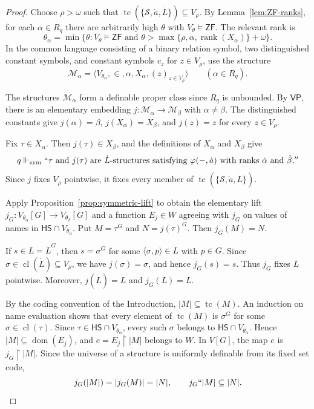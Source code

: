 \documentclass[11pt,a4paper]{amsart}
\newcommand{\VP}{\mathsf{VP}}
\newcommand{\ZF}{\mathsf{ZF}}
\newcommand{\HS}{\mathsf{HS}}
\newcommand{\tc}{\operatorname{tc}}
\newcommand{\rank}{\operatorname{rank}}
\newcommand{\forcesS}{\Vdash_{\mathrm{sym}}}
\newcommand{\restr}{\mathbin{\upharpoonright}}
\theoremstyle{plain}
\theoremstyle{definition}
\theoremstyle{remark}
\begin{document}
\begin{proof}
Choose $\rho>\omega$ such that $\tc(\{\mathscr S,\dot a,\dot L\})\subseteq V_\rho$.  By Lemma~\ref{lem:ZF-ranks}, for each $\alpha\in R_q$ there are arbitrarily high $\theta$ with $V_\theta\models\ZF$.  The relevant rank is
\[
\theta_\alpha=\min\bigl\{\theta:V_\theta\models\ZF\text{ and }
\theta>\max\{\rho,\alpha,\rank(X_\alpha)\}+\omega\bigr\}.
\]
In the common language consisting of a binary relation symbol, two distinguished constant symbols, and constant symbols $c_z$ for $z\in V_\rho$, use the structure
\[
\mathcal M_\alpha=
\bigl\langle V_{\theta_\alpha},\in,\alpha,X_\alpha,(z)_{z\in V_\rho}\bigr\rangle
\qquad(\alpha\in R_q).
\]

The structures $\mathcal M_\alpha$ form a definable proper class since $R_q$ is unbounded.  By $\VP$, there is an elementary embedding $j:\mathcal M_\alpha\to\mathcal M_\beta$ with $\alpha\ne\beta$.  The distinguished constants give $j(\alpha)=\beta$, $j(X_\alpha)=X_\beta$, and $j(z)=z$ for every $z\in V_\rho$.

Fix $\tau\in X_\alpha$.  Then $j(\tau)\in X_\beta$, and the definitions of $X_\alpha$ and $X_\beta$ give
\begin{equation}\label{eq:q-witness}
q\forcesS ``\tau\text{ and }j(\tau)\text{ are }\dot L\text{-structures satisfying }
\varphi(-,\dot a)\text{ with ranks }\check\alpha\text{ and }\check\beta.''
\end{equation}
Since $j$ fixes $V_\rho$ pointwise, it fixes every member of $\tc(\{\mathscr S,\dot a,\dot L\})$.

Apply Proposition~\ref{prop:symmetric-lift} to obtain the elementary lift
$j_G:V_{\theta_\alpha}[G]\to V_{\theta_\beta}[G]$ and a function $E_j\in W$ agreeing with $j_G$ on values of names in $\HS\cap V_{\theta_\alpha}$.  Put $M=\tau^G$ and $N=j(\tau)^G$.  Then $j_G(M)=N$.

If $s\in L=\dot L^G$, then $s=\sigma^G$ for some $\langle\sigma,p\rangle\in\dot L$ with $p\in G$.  Since $\sigma\in\operatorname{cl}(\dot L)\subseteq V_\rho$, we have $j(\sigma)=\sigma$, and hence $j_G(s)=s$.  Thus $j_G$ fixes $L$ pointwise.  Moreover, $j(\dot L)=\dot L$ and $j_G(L)=L$.

By the coding convention of the Introduction, $\lvert M\rvert\subseteq\tc(M)$.  An induction on name evaluation shows that every element of $\tc(M)$ is $\sigma^G$ for some $\sigma\in\operatorname{cl}(\tau)$.  Since $\tau\in\HS\cap V_{\theta_\alpha}$, every such $\sigma$ belongs to $\HS\cap V_{\theta_\alpha}$.  Hence $|M|\subseteq\operatorname{dom}(E_j)$, and $e=E_j\restr|M|$ belongs to $W$.  In $V[G]$, the map $e$ is $j_G\restr|M|$.  Since the universe of a structure is uniformly definable from its fixed set code,
\[
j_G(|M|)=|j_G(M)|=|N|,
\qquad j_G``|M|\subseteq|N|.
\]


\end{proof}
\end{document}
